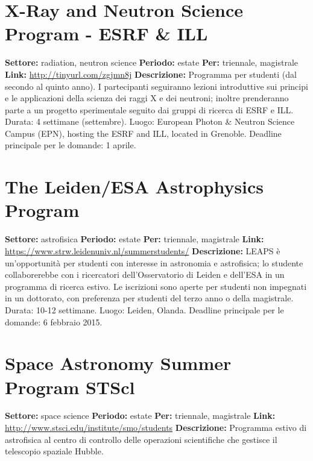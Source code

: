 \documentclass[a4paper,10pt]{article}
\begin{document}
\section{X-Ray and Neutron Science Program - ESRF \& ILL} 
\textbf{Settore:} radiation, neutron science\newline
\textbf{Periodo:} estate\newline
\textbf{Per:} triennale, magistrale\newline
\textbf{Link:} \url{http://tinyurl.com/zgjmn8j} \newline
\textbf{Descrizione:} Programma per studenti (dal secondo al quinto anno). I partecipanti seguiranno lezioni introduttive sui principi e le applicazioni della scienza dei raggi X e dei neutroni; inoltre prenderanno parte a un progetto sperimentale seguito dai gruppi di ricerca di ESRF e ILL. Durata: 4 settimane (settembre). Luogo: European Photon \& Neutron Science Campus (EPN), hosting the ESRF and ILL, located in Grenoble. Deadline principale per le domande: 1 aprile.

\section{The Leiden/ESA Astrophysics Program}
\textbf{Settore:} astrofisica\newline
\textbf{Periodo:} estate \newline
\textbf{Per:} triennale, magistrale\newline
\textbf{Link:} \url{https://www.strw.leidenuniv.nl/summerstudents/} \newline
\textbf{Descrizione:} LEAPS è un’opportunità per studenti con interesse in astronomia e astrofisica; lo studente collaborerebbe con i ricercatori dell'Osservatorio di Leiden e dell’ESA in un programma di ricerca estivo. Le iscrizioni sono aperte per studenti non impegnati in un dottorato, con preferenza per studenti del terzo anno o della magistrale. Durata: 10-12 settimane. Luogo: Leiden, Olanda. Deadline principale per le domande: 6 febbraio 2015.

\section{Space Astronomy Summer Program STScl}
\textbf{Settore:} space science\newline
\textbf{Periodo:} estate\newline
\textbf{Per:} triennale, magistrale\newline
\textbf{Link:} \url{http://www.stsci.edu/institute/smo/students} \newline
\textbf{Descrizione:} Programma estivo di astrofisica al centro di controllo delle operazioni scientifiche che gestisce il telescopio spaziale Hubble.  
\end{document}
